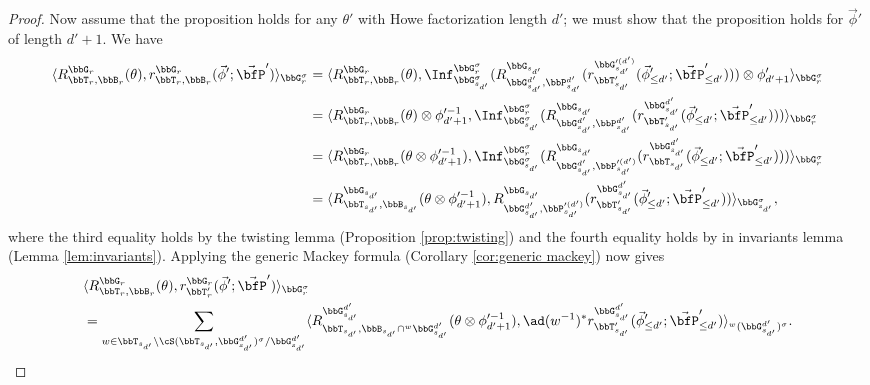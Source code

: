 \begin{proof}
  Now assume that the proposition holds for any $\theta'$ with Howe factorization length $d'$; we must show that the proposition holds for $\vec \phi'$ of length $d'+1$. We have
  \begin{align*}
    \langle R_{\bbT_r,\bbB_r}^{\bbG_r}(\theta), r_{\bbT_r,\bbB_r}^{\bbG_r}(\vec \phi'; \vec \bfP') \rangle_{\bbG_r^\sigma} 
    &= \langle R_{\bbT_r,\bbB_r}^{\bbG_r}(\theta), \Inf_{\bbG_{s_{d'}}^\sigma}^{\bbG_{r}^\sigma}(R_{\bbG_{s_{d'}}^{d'},\bbP_{s_{d'}}^{d'}}^{\bbG_{s_{d'}}}(r_{\bbT_{s_{d'}}'}^{\bbG_{s_{d'}}^{\prime(d')}}(\vec \phi_{\leq d'}'; \vec \bfP_{\leq d'}'))) \otimes \phi_{d'+1}' \rangle_{\bbG_r^\sigma} \\
    &= \langle R_{\bbT_r,\bbB_r}^{\bbG_r}(\theta) \otimes \phi_{d'+1}^{\prime-1}, \Inf_{\bbG_{s_{d'}}^\sigma}^{\bbG_{r}^\sigma}(R_{\bbG_{s_{d'}}^{d'},\bbP_{s_{d'}}^{d'}}^{\bbG_{s_{d'}}}(r_{\bbT_{s_{d'}}'}^{\bbG_{s_{d'}}^{d'}}(\vec \phi_{\leq d'}'; \vec \bfP_{\leq d'}')))\rangle_{\bbG_r^\sigma} \\
    &= \langle R_{\bbT_r,\bbB_r}^{\bbG_r}(\theta \otimes \phi_{d'+1}^{\prime-1}), \Inf_{\bbG_{s_{d'}}^\sigma}^{\bbG_{r}^\sigma}(R_{\bbG_{s_{d'}}^{d'},\bbP_{s_{d'}}^{\prime (d')}}^{\bbG_{s_{d'}}}(r_{\bbT_{s_{d'}}}^{\bbG_{s_{d'}}^{d'}}(\vec \phi_{\leq d'}'; \vec \bfP_{\leq d'}')))\rangle_{\bbG_r^\sigma} \\
    &= \langle R_{\bbT_{s_{d'}},\bbB_{s_{d'}}}^{\bbG_{s_{d'}}}(\theta \otimes \phi_{d'+1}^{\prime-1}), R_{\bbG_{s_{d'}}^{d'},\bbP_{s_{d'}}^{\prime(d')}}^{\bbG_{s_{d'}}}(r_{\bbT_{s_{d'}}'}^{\bbG_{s_{d'}}^{d'}}(\vec \phi_{\leq d'}'; \vec \bfP_{\leq d'}'))\rangle_{\bbG_{s_{d'}}^\sigma},
  \end{align*}
  where the third equality holds by the twisting lemma (Proposition \ref{prop:twisting}) and the fourth equality holds by in invariants lemma (Lemma \ref{lem:invariants}). Applying the generic Mackey formula (Corollary \ref{cor:generic mackey}) now gives
  \begin{align*}
    &\langle R_{\bbT_r,\bbB_r}^{\bbG_r}(\theta), r_{\bbT_r'}^{\bbG_r}(\vec \phi'; \vec \bfP') \rangle_{\bbG_r^\sigma} \\
    &= \sum_{w \in \bbT_{s_{d'}} \backslash \cS(\bbT_{s_{d'}},\bbG_{s_{d'}}^{d'})^\sigma/\bbG_{s_{d'}}^{d'}} \langle R_{\bbT_{s_{d'}}, \bbB_{s_{d'}} \cap {}^w \bbG_{s_{d'}}^{d'}}^{\bbG_{s_{d'}}^{d'}}(\theta \otimes \phi_{d'+1}^{\prime-1}), \ad(w^{-1})^* r_{\bbT_{s_{d'}}'}^{\bbG_{s_{d'}}^{d'}}(\vec \phi_{\leq d'}'; \vec \bfP_{\leq d'}') \rangle_{{}^w (\bbG_{s_{d'}}^{d'})^\sigma}.
  \end{align*}

\end{proof}
